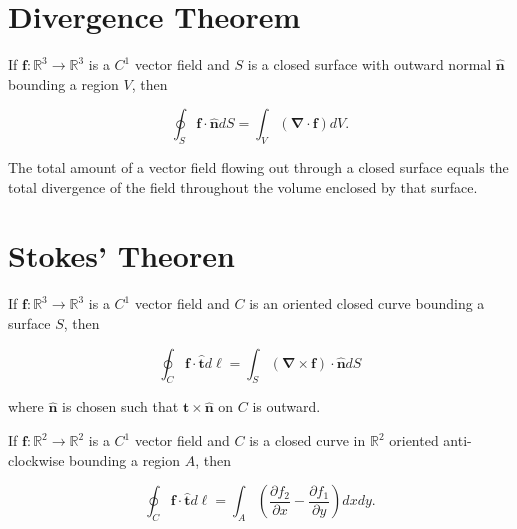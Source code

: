 \section{Divergence Theorem}

\begin{theorem}
  If \(\boldsymbol{f}: \mathbb{R}^3 \rightarrow \mathbb{R}^3\) is a \(C^1\) vector field and \(S\) is a closed surface with outward normal \(\hat{\boldsymbol{n}}\) bounding a region \(V\), then

\[
\oint_S \boldsymbol{f} \cdot \hat{\boldsymbol{n}} d S=\int_V(\boldsymbol{\nabla} \cdot \boldsymbol{f}) d V .
\]
\end{theorem}

\begin{remark}
The total amount of a vector field flowing out through a closed surface equals the total divergence of the field throughout the volume enclosed by that surface.
\end{remark}

\begin{proofidea}
  
  
\begin{formalproof}
  
\end{formalproof}
  
\end{proofidea}

\section{Stokes' Theoren}

\begin{theorem}
  If \(\boldsymbol{f}: \mathbb{R}^3 \rightarrow \mathbb{R}^3\) is a \(C^1\) vector field and \(C\) is an oriented closed curve bounding a surface \(S\), then

\[
\oint_C \boldsymbol{f} \cdot \hat{\boldsymbol{t}} d \boldsymbol{\ell}=\int_S(\boldsymbol{\nabla} \times \boldsymbol{f}) \cdot \hat{\boldsymbol{n}} d S
\]

where \(\hat{\boldsymbol{n}}\) is chosen such that \(\hat{\boldsymbol{t}} \times \hat{\boldsymbol{n}}\) on \(C\) is outward.
\end{theorem}

\begin{theorem}
  If \(\boldsymbol{f}: \mathbb{R}^2 \rightarrow \mathbb{R}^2\) is a \(C^1\) vector field and \(C\) is a closed curve in \(\mathbb{R}^2\) oriented anti-clockwise bounding a region \(A\), then

\[
\oint_C \boldsymbol{f} \cdot \hat{\boldsymbol{t}} d \ell=\int_A\left(\frac{\partial f_2}{\partial x}-\frac{\partial f_1}{\partial y}\right) d x d y .
\]
\end{theorem}

